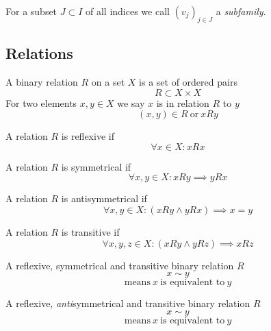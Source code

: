 \begin{definition}[Subfamily]
   For a subset \(J \subset I\) of all indices we call \((v_j)_{j \in J}\) a \textit{subfamily}.
\end{definition}

\subsection{Relations}
\begin{definition}
   A binary relation \(R\) on a set \(X\) is a set of ordered pairs
   \[R \subset X \times X\]
   For two elements \(x, y \in X\) we say \(x\) is in relation \(R\) to \(y\)
   \[(x, y) \in R~\text{or}~xRy\]
\end{definition}

\begin{definition}[Reflexive]
   A relation \(R\) is reflexive if
   \[\forall x \in X: xRx\]
\end{definition}

\begin{definition}[Symmetrical]
   A relation \(R\) is symmetrical if
   \[\forall x,y \in X: xRy \implies yRx\]
\end{definition}

\begin{definition}[Antisymmetrical]
   A relation \(R\) is antisymmetrical if
   \[\forall x,y \in X: (xRy \land yRx) \implies x = y\]
\end{definition}

\begin{definition}[Transitive]
   A relation \(R\) is transitive if
   \[\forall x, y, z \in X: (xRy \land yRz) \implies xRz\]
\end{definition}

\begin{definition}\label{def:equiv_rel}
   A reflexive, symmetrical and transitive binary relation \(R\)
   \[x \sim y\]
   \[\text{means}~x~\text{is equivalent to}~y\]
\end{definition}

\begin{definition}
   A reflexive, \textit{anti}symmetrical and transitive binary relation \(R\)
   \[x \sim y\]
   \[\text{means}~x~\text{is equivalent to}~y\]
\end{definition}

